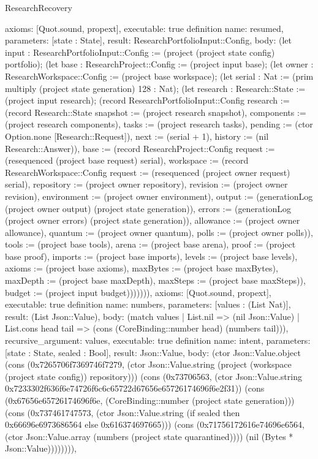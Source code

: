 \begin{lexlean}{ResearchRecovery}
\begin{semanticmodule}
{ axioms: [Quot.sound, propext],
 executable: true
}
definition{
 name: resumed,
 parameters: [state : State],
 result: ResearchPortfolioInput::Config,
 body: (let input : ResearchPortfolioInput::Config := (project (project state config) portfolio); (let base : ResearchProject::Config := (project input base); (let owner : ResearchWorkspace::Config := (project base workspace); (let serial : Nat := (prim multiply (project state generation) 128 : Nat); (let research : Research::State := (project input research); (record ResearchPortfolioInput::Config {research := (record Research::State {snapshot := (project research snapshot), components := (project research components), tasks := (project research tasks), pending := (ctor Option.none [Research::Request]), next := (serial + 1), history := (nil Research::Answer)}), base := (record ResearchProject::Config {request := (resequenced (project base request) serial), workspace := (record ResearchWorkspace::Config {request := (resequenced (project owner request) serial), repository := (project owner repository), revision := (project owner revision), environment := (project owner environment), output := (generationLog (project owner output) (project state generation)), errors := (generationLog (project owner errors) (project state generation)), allowance := (project owner allowance), quantum := (project owner quantum), polls := (project owner polls)}), tools := (project base tools), arena := (project base arena), proof := (project base proof), imports := (project base imports), levels := (project base levels), axioms := (project base axioms), maxBytes := (project base maxBytes), maxDepth := (project base maxDepth), maxSteps := (project base maxSteps)}), budget := (project input budget)})))))),
 axioms: [Quot.sound, propext],
 executable: true
}
definition{
 name: numbers,
 parameters: [values : (List Nat)],
 result: (List Json::Value),
 body: (match values | List.nil => (nil Json::Value) | List.cons head tail => (cons (CoreBinding::number head) (numbers tail))),
 recursive_argument: values,
 executable: true
}
definition{
 name: intent,
 parameters: [state : State, sealed : Bool],
 result: Json::Value,
 body: (ctor Json::Value.object (cons (0x7265706f7369746f7279, (ctor Json::Value.string (project (workspace (project state config)) repository))) (cons (0x73706563, (ctor Json::Value.string 0x7233302f636f6e74726f6c6c65722d67656e65726174696f6e2f31)) (cons (0x67656e65726174696f6e, (CoreBinding::number (project state generation))) (cons (0x737461747573, (ctor Json::Value.string (if sealed then 0x66696e6973686564 else 0x616374697665))) (cons (0x71756172616e74696e6564, (ctor Json::Value.array (numbers (project state quarantined)))) (nil (Bytes * Json::Value)))))))),
}
\end{semanticmodule}
\end{lexlean}
